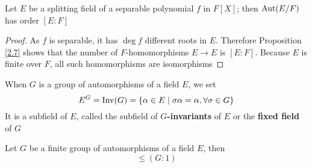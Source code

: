\documentclass[11pt]{article}
\begin{document}
\begin{proposition}[]
\label{3.2}
Let \(E\) be a splitting field of a separable polynomial \(f\) in \(F[X]\); then \(\operatorname{\text{Aut}}(E/F)\)
has order \([E:F]\)
\end{proposition}

\begin{proof}
As \(f\) is separable, it has \(\deg f\) different roots in \(E\). Therefore Proposition \ref{2.7}
shows that the number of \(F\)-homomorphisms \(E\to E\) is \([E:F]\). Because \(E\) is finite
over \(F\), all such homomorphisms are isomorphisms
\end{proof}

When \(G\) is a group of automorphisms of a field \(E\), we set
\begin{equation*}
E^G=\operatorname{Inv}(G)=\{\alpha\in E\mid\sigma\alpha=\alpha,\forall\sigma\in G\}
\end{equation*}
It is a subfield of \(E\), called the subfield of \textbf{\(G\)-invariants} of \(E\) or the \textbf{fixed field}
of \(G\)

\begin{theorem}[E. Artin]
\label{3.4}
Let \(G\) be a finite group of automorphisms of a field \(E\), then
\begin{equation*}
[E:E^G]\le(G:1)
\end{equation*}
\end{theorem}
\end{document}
